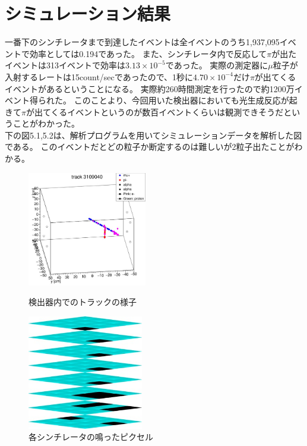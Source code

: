 \section{シミュレーション結果}
一番下のシンチレータまで到達したイベントは全イベントのうち1,937,095イベントで効率としては0.194であった。
また、シンチレータ内で反応して$\pi$が出たイベントは313イベントで効率は$3.13 \times10^{-5}$であった。
実際の測定器に$\mu$粒子が入射するレートは15count/secであったので、1秒に$4.70 \times10^{-4}$だけ$\pi$が出てくるイベントがあるということになる。
実際約260時間測定を行ったので約1200万イベント得られた。
このことより、今回用いた検出器においても光生成反応が起きて$\pi$が出てくるイベントというのが数百イベントくらいは観測できそうだということがわかった。
\\
下の図5.1,5.2は、解析プログラムを用いてシミュレーションデータを解析した図である。
このイベントだとどの粒子か断定するのは難しいが2粒子出たことがわかる。
\begin{figure}
    \begin{minipage}[b]{0.47\linewidth}
        \centering
        \includegraphics[height=5cm]{img/track_pion.jpg}
        \caption{検出器内でのトラックの様子}
    \end{minipage}
    \begin{minipage}[b]{0.47\linewidth}
        \centering
        \includegraphics[height=5cm]{img/track_simulation.jpg}
        \caption{各シンチレータの鳴ったピクセル}
    \end{minipage}
\end{figure}
        
